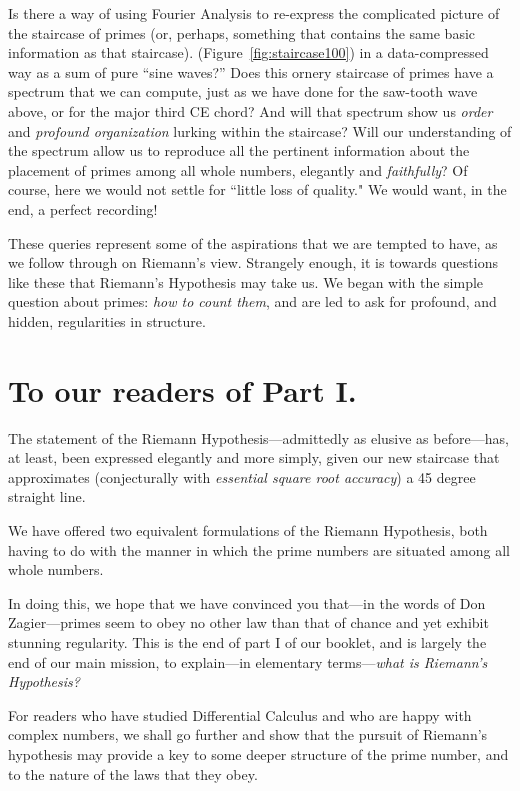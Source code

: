 \documentclass[11pt,draft]{article}
\theoremstyle{plain}
\theoremstyle{definition}
\numberwithin{equation}{section}
\numberwithin{figure}{section}
\numberwithin{table}{section}
\begin{document}
Is there a way of using Fourier Analysis to re-express the complicated
picture of the staircase of primes (or, perhaps, something
  that contains the same basic information as that staircase).
(Figure~\ref{fig:staircase100}) in a data-compressed way as a sum of
pure ``sine waves?''  Does this ornery staircase of primes have a
spectrum that we can compute, just as we have done for the saw-tooth
wave above, or for the major third CE chord?  And will that spectrum
show us {\em order} and {\em profound organization} lurking within the
staircase?  Will our understanding of the spectrum allow us to
reproduce all the pertinent information about the placement of primes
among all whole numbers, elegantly and {\em faithfully}?  Of course,
here we would not settle for ``little loss of quality." We would want,
in the end, a perfect recording!
  
 
These queries represent some of the aspirations that we are tempted to
have, as we follow through on Riemann's view. Strangely enough, it is
towards questions like these that Riemann's Hypothesis may take us. We
began with the simple question about primes: {\em how to count them},
and are led to ask for profound, and hidden, regularities in
structure.

\section{ To our readers of Part I. } 
The statement of the Riemann Hypothesis---admittedly as elusive as
before---has, at least, been expressed elegantly and more simply,
given our new staircase that approximates (conjecturally with {\em
  essential square root accuracy}) a 45 degree straight line.
   
We have offered two equivalent formulations of the Riemann Hypothesis,
both having to do with the manner in which the prime numbers are
situated among all whole numbers.

In doing this, we hope that we have convinced you that---in the words
of Don Zagier---primes seem to obey no other law than that of chance
and yet exhibit stunning regularity.  This is the end of part I of our
booklet, and is largely the end of our main mission, to explain---in
elementary terms---{\em what is Riemann's Hypothesis?}
    
     
For readers who have studied Differential Calculus and who are happy
with complex numbers, we shall go further and show that the pursuit of
Riemann's hypothesis may provide a key to some deeper structure of the
prime number, and to the nature of the laws that they obey.
\end{document}
